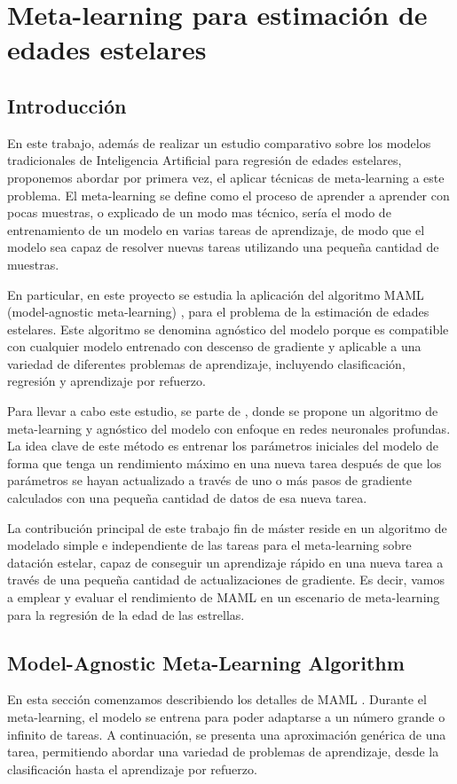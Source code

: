 \chapter{Meta-learning para estimación de edades estelares}

\section{Introducción}

En este trabajo, además de realizar un estudio comparativo sobre los modelos tradicionales de Inteligencia Artificial para regresión de edades estelares, proponemos abordar por primera vez, el aplicar técnicas de meta-learning a este problema. El meta-learning se define como el proceso de aprender a aprender con pocas muestras, o explicado de un modo mas técnico, sería el modo de entrenamiento de un modelo en varias tareas de aprendizaje, de modo que el modelo sea capaz de resolver nuevas tareas utilizando una pequeña cantidad de muestras. 

En particular, en este proyecto se estudia la aplicación del algoritmo MAML (model-agnostic meta-learning) \cite{finn2017modelagnostic}, para el problema de la estimación de edades estelares. Este algoritmo se denomina agnóstico del modelo porque es compatible con cualquier modelo entrenado con descenso de gradiente y aplicable a una variedad de diferentes problemas de aprendizaje, incluyendo clasificación, regresión y aprendizaje por refuerzo. 

Para llevar a cabo este estudio, se parte de \cite{finn2017modelagnostic}, donde se propone un algoritmo de meta-learning y agnóstico del modelo con enfoque en redes neuronales profundas. La idea clave de este método es entrenar los parámetros iniciales del modelo de forma que tenga un rendimiento máximo en una nueva tarea después de que los parámetros se hayan actualizado a través de uno o más pasos de gradiente calculados con una pequeña cantidad de datos de esa nueva tarea.

La contribución principal de este trabajo fin de máster reside en un algoritmo de modelado simple e independiente de las tareas para el meta-learning sobre datación estelar, capaz de conseguir un aprendizaje rápido en una nueva tarea a través de una pequeña cantidad de actualizaciones de gradiente. Es decir, vamos a emplear y evaluar el rendimiento de MAML en un escenario de meta-learning para la regresión de la edad de las estrellas. 

\section{Model-Agnostic Meta-Learning Algorithm}
\label{sec:metalearning}
En esta sección comenzamos describiendo los detalles de MAML \cite{finn2017modelagnostic}. Durante el meta-learning, el modelo se entrena para poder adaptarse a un número grande o infinito de tareas. A continuación, se presenta una aproximación genérica de una tarea, permitiendo abordar una variedad de problemas de aprendizaje, desde la clasificación hasta el aprendizaje por refuerzo.

